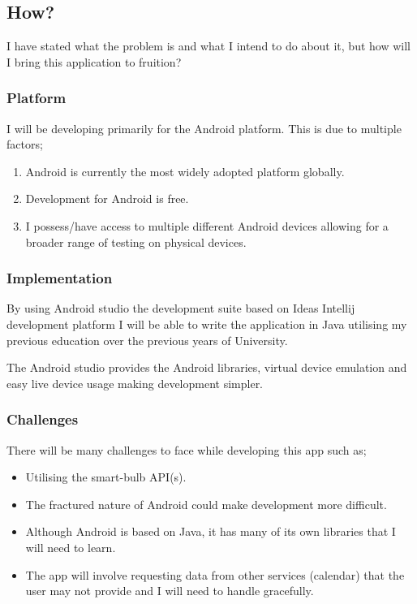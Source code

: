 \subsection{How?}\label{how}

I have stated what the problem is and what I intend to do about it, but
how will I bring this application to fruition?

\subsubsection{Platform}\label{platform}

I will be developing primarily for the Android platform. This is due to
multiple factors;

\begin{enumerate}
\def\labelenumi{\arabic{enumi})}
\item
  Android is currently the most widely adopted platform globally.
\item
  Development for Android is free.
\item
  I possess/have access to multiple different Android devices allowing
  for a broader range of testing on physical devices.
\end{enumerate}

\subsubsection{Implementation}\label{implementation}

By using Android studio the development suite based on Ideas Intellij
development platform I will be able to write the application in Java
utilising my previous education over the previous years of University.

The Android studio provides the Android libraries, virtual device
emulation and easy live device usage making development simpler.

\subsubsection{Challenges}\label{challenges}

There will be many challenges to face while developing this app such as;

\begin{itemize}
\item
  Utilising the smart-bulb API(s).
\item
  The fractured nature of Android could make development more difficult.
\item
  Although Android is based on Java, it has many of its own libraries
  that I will need to learn.
\item
  The app will involve requesting data from other services (calendar)
  that the user may not provide and I will need to handle gracefully.
\end{itemize}

